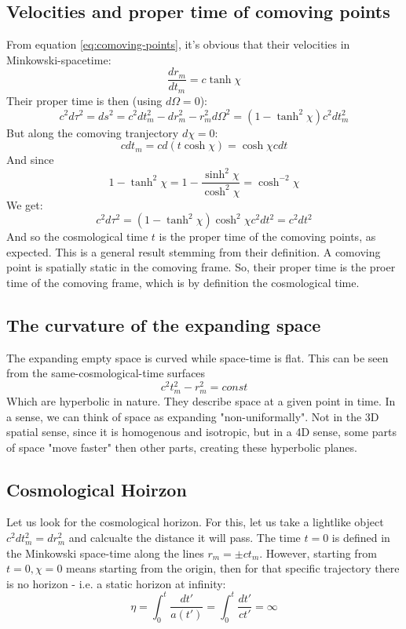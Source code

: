 \documentclass{article}
\begin{document}
\subsection{Velocities and proper time of comoving points}
From equation \ref{eq:comoving-points}, it's obvious that their velocities in Minkowski-spacetime:
\begin{equation}
    \frac{dr_m}{dt_m} = c\tanh \chi
\end{equation}
Their proper time is then (using $d\Omega = 0$):
\begin{equation}
    c^2d\tau^2 = ds^2 = c^2dt_m^2 - dr_m^2 - r_m^2 d\Omega^2 = \left(1 - \tanh^2 \chi\right)c^2dt_m^2
\end{equation}
But along the comoving tranjectory $d\chi = 0$:
\begin{equation}
    cdt_m = cd(t \cosh \chi) = \cosh\chi cdt
\end{equation}
And since
\begin{equation}
    1 - \tanh^2 \chi = 1 - \frac{\sinh^2 \chi}{\cosh^2 \chi} = \cosh^{-2}\chi
\end{equation}
We get:
\begin{equation}
    c^2 d\tau^2 = \left(1 - \tanh^2 \chi\right)\cosh^2 \chi c^2 dt^2 = c^2 dt^2
\end{equation}
And so the cosmological time $t$ is the proper time of the comoving points, as expected. This is a general result stemming from their definition. A comoving point is spatially static in the comoving frame. So, their proper time is the proer time of the comoving frame, which is by definition the cosmological time.

\subsection{The curvature of the expanding space}
The expanding empty space is curved while space-time is flat. This can be seen from the same-cosmological-time surfaces
\begin{equation}
    c^2t_m^2 - r_m^2 = const
\end{equation}
Which are hyperbolic in nature. They describe space at a given point in time. In a sense, we can think of space as expanding "non-uniformally". Not in the 3D spatial sense, since it is homogenous and isotropic, but in a 4D sense, some parts of space "move faster" then other parts, creating these hyperbolic planes.

\subsection{Cosmological Hoirzon}
Let us look for the cosmological horizon. For this, let us take a lightlike object $c^2dt_m^2 = dr_m^2$ and calcualte the distance it will pass. The time $t = 0$ is defined in the Minkowski space-time along the lines $r_m = \pm ct_m$. However, starting from $t = 0, \chi = 0$ means starting from the origin, then for that specific trajectory there is no horizon - i.e. a static horizon at infinity:
\begin{equation}
    \eta = \int_0^t \frac{dt'}{a(t')} = \int_0^t \frac{dt'}{ct'} = \infty
\end{equation}
\end{document}

